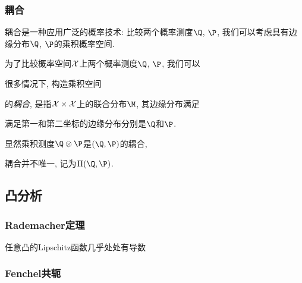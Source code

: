 %


\subsubsection{耦合}

耦合是一种应用广泛的概率技术: 比较两个概率测度$\Q$, $\P$, 我们可以考虑具有边缘分布$\Q$, $\P$的乘积概率空间. 

为了比较概率空间$\mathcal{X}$上两个概率测度$\Q$, $\P$, 我们可以

很多情况下, 构造乘积空间

的\emph{耦合}, 是指$\mathcal{X} \times \mathcal{X}$上的联合分布$\M$, 其边缘分布满足

满足第一和第二坐标的边缘分布分别是$\Q$和$\P$.


显然乘积测度$\Q \otimes \P$是$(\Q, \P)$的耦合, 

耦合并不唯一, 记为$\Pi(\Q, \P)$. 


\subsection{凸分析}

\subsubsection{Rademacher定理}

\begin{theorem}[Rademacher]\label{thm:Rademacher}
	任意凸的Lipschitz函数几乎处处有导数
\end{theorem}


\subsubsection{Fenchel共轭}

